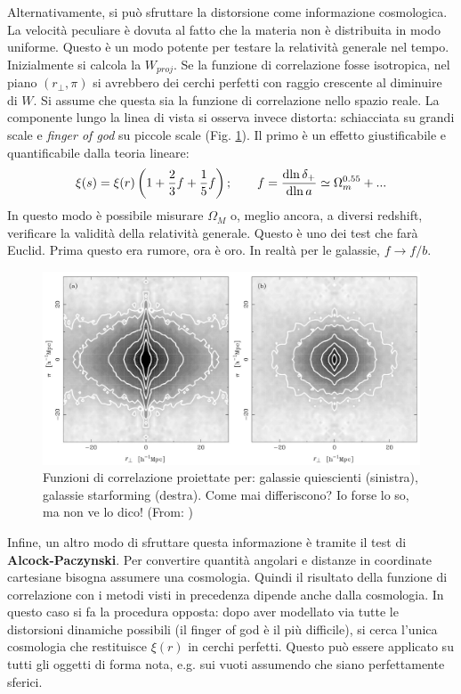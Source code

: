 \vspace{1em}
Alternativamente, si può sfruttare la distorsione come informazione cosmologica. La velocità peculiare è dovuta al fatto che la materia non è distribuita in modo uniforme. Questo è un modo potente per testare la relatività generale nel tempo. Inizialmente si calcola la $W_{proj}$. Se la funzione di correlazione fosse isotropica, nel piano $(r_\perp,\pi)$ si avrebbero dei cerchi perfetti con raggio crescente al diminuire di $W$. Si assume che questa sia la funzione di correlazione nello spazio reale. La componente lungo la linea di vista si osserva invece distorta: schiacciata su grandi scale e \textit{finger of god} su piccole scale (Fig. \ref{fig:fine}). Il primo è un effetto giustificabile e quantificabile dalla teoria lineare:
\begin{equation}
    \xi(s)=\xi(r)\left(1+\frac{2}{3}f+\frac{1}{5}f\right);\qquad f=\frac{\operatorname{d}\!{\ln \delta_+}}{\operatorname{d}\!{\ln a}}\simeq \Omega_{m}^{0.55}+...
\end{equation}
In questo modo è possibile misurare $\Omega_M$ o, meglio ancora, a diversi redshift, verificare la validità della relatività generale. Questo è uno dei test che farà Euclid. Prima questo era rumore, ora è oro. In realtà per le galassie, $f\to f/b$.
\begin{figure}[H]
    \centering
    \includegraphics[width=.75 \textwidth]{Pictures/10/apforse.jpg}
    \caption{Funzioni di correlazione proiettate per: galassie quiescienti (sinistra), galassie starforming (destra). Come mai differiscono? Io forse lo so, ma non ve lo dico! (From: \cite{Norberg_2002})}\label{fig:fine}
\end{figure}

\vspace{1em}
Infine, un altro modo di sfruttare questa informazione è tramite il test di \textbf{Alcock-Paczynski}. Per convertire quantità angolari e distanze in coordinate cartesiane bisogna assumere una cosmologia. Quindi il risultato della funzione di correlazione con i metodi visti in precedenza dipende anche dalla cosmologia. In questo caso si fa la procedura opposta: dopo aver modellato via tutte le distorsioni dinamiche possibili (il finger of god è il più difficile), si cerca l'unica cosmologia che restituisce $\xi (r)$ in cerchi perfetti. Questo può essere applicato su tutti gli oggetti di forma nota, e.g. sui vuoti assumendo che siano perfettamente sferici.